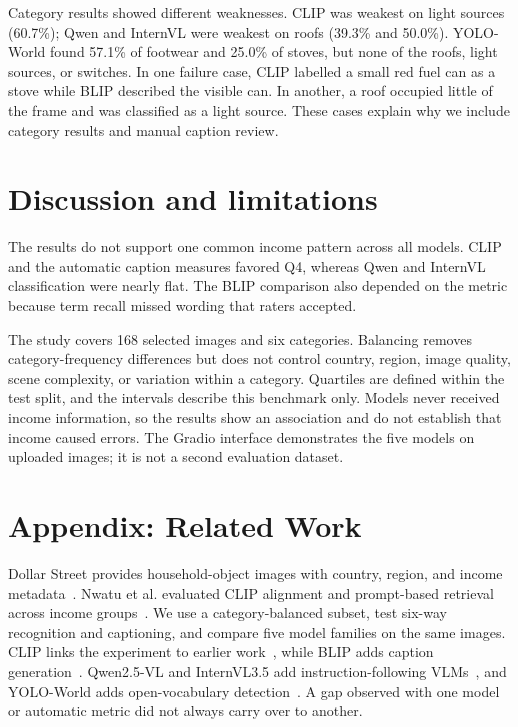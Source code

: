 \documentclass[10pt,twocolumn,letterpaper]{article}
\begin{document}
Category results showed different weaknesses. CLIP was weakest on light sources (60.7\%); Qwen and InternVL were weakest on roofs (39.3\% and 50.0\%). YOLO-World found 57.1\% of footwear and 25.0\% of stoves, but none of the roofs, light sources, or switches. In one failure case, CLIP labelled a small red fuel can as a stove while BLIP described the visible can. In another, a roof occupied little of the frame and was classified as a light source. These cases explain why we include category results and manual caption review.

\section{Discussion and limitations}
The results do not support one common income pattern across all models. CLIP and the automatic caption measures favored Q4, whereas Qwen and InternVL classification were nearly flat. The BLIP comparison also depended on the metric because term recall missed wording that raters accepted.

The study covers 168 selected images and six categories. Balancing removes category-frequency differences but does not control country, region, image quality, scene complexity, or variation within a category. Quartiles are defined within the test split, and the intervals describe this benchmark only. Models never received income information, so the results show an association and do not establish that income caused errors. The Gradio interface demonstrates the five models on uploaded images; it is not a second evaluation dataset.

\clearpage
\section*{Appendix: Related Work}
Dollar Street provides household-object images with country, region, and income metadata~\cite{rojas2022}. Nwatu et al. evaluated CLIP alignment and prompt-based retrieval across income groups~\cite{nwatu2023}. We use a category-balanced subset, test six-way recognition and captioning, and compare five model families on the same images. CLIP links the experiment to earlier work~\cite{radford2021}, while BLIP adds caption generation~\cite{li2022}. Qwen2.5-VL and InternVL3.5 add instruction-following VLMs~\cite{bai2025,wang2025}, and YOLO-World adds open-vocabulary detection~\cite{cheng2024}. A gap observed with one model or automatic metric did not always carry over to another.

{\small


}
\end{document}

